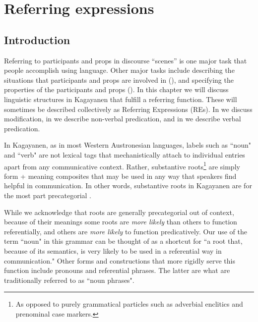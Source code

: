 \chapter{Referring expressions}
\label{chap:referringexpressions}
\section{Introduction}
\label{sec:introduction-3}

Referring to participants and props in discourse “scenes” is one major task that people accomplish using language. Other major tasks include describing the situations that participants and props are involved in (), and specifying the properties of the participants and props (). In this chapter we will discuss linguistic structures in Kagayanen that fulfill a referring function. These will sometimes be described collectively as Referring Expressions (REs). In  we discuss modification, in  we describe non-verbal predication, and in  we describe verbal predication.

In Kagayanen, as in most Western Austronesian languages, labels such as ``noun" and ``verb" are not lexical tags that mechanistically attach to individual entries apart from any communicative context. Rather, substantive roots\footnote{As opposed to purely grammatical particles such as adverbial enclitics and prenominal case markers.} are simply form + meaning composites that may be used in any way that speakers find helpful in communication. In other words, substantive roots in Kagayanen are for the most part  precategorial \citep{himmelmann2008}. 

While we acknowledge that roots are generally precategorial out of context, because of their meanings some roots are \textit{more likely} than others to function referentially, and others are \textit{more likely} to function predicatively. Our use of the term ``noun" in this grammar can be thought of as a shortcut for ``a root that, because of its semantics, is very likely to be used in a referential way in communication." Other forms and constructions that more rigidly serve this function include pronouns and referential phrases. The latter are what are traditionally referred to as ``noun phrases". 

